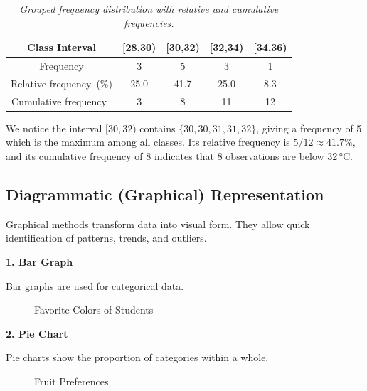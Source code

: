 \documentclass[twoside]{book}
\begin{document}
\begin{table}[H]
\centering
\begin{tabular}{c|cccc}
\toprule
\textbf{Class Interval} & {[}28,30) & {[}30,32) & {[}32,34) & {[}34,36) \\ \midrule
Frequency               & 3         & 5         & 3         & 1         \\
Relative frequency\ (\%)    & 25.0    & 41.7   & 25.0    & 8.3     \\
Cumulative frequency\       & 3         & 8         & 11        & 12        \\
\bottomrule
\end{tabular}
\caption{\textit{Grouped frequency distribution with relative and cumulative frequencies.}}
\end{table}

We notice the interval \([30,32)\) contains \(\{30,30,31,31,32\}\), giving a frequency of 5 which is the maximum among all classes. Its relative frequency is \(5/12\approx41.7\%\), and its cumulative frequency of 8 indicates that 8 observations are below 32 °C.


\subsection{Diagrammatic (Graphical) Representation}
Graphical methods transform data into visual form. They allow quick identification of patterns, trends, and outliers.

\textbf{1. Bar Graph}

Bar graphs are used for categorical data.

\begin{figure}[H]
\centering
{}
\caption{Favorite Colors of Students}
\end{figure}

\textbf{2. Pie Chart}

Pie charts show the proportion of categories within a whole.

\begin{figure}[H]
\centering
{}
\caption{Fruit Preferences}
\end{figure}
\end{document}
